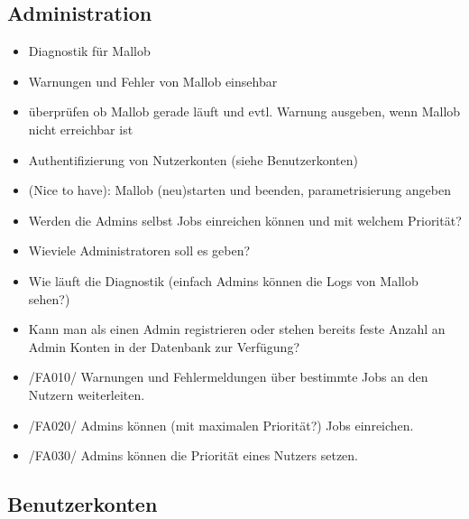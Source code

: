 \subsection{Administration}
\begin{itemize}
    \item Diagnostik für Mallob
    \item Warnungen und Fehler von Mallob einsehbar
    \item überprüfen ob Mallob gerade läuft und evtl. Warnung ausgeben, wenn Mallob nicht erreichbar ist
    \item Authentifizierung von Nutzerkonten (siehe Benutzerkonten)
    
        
    \item (Nice to have): Mallob (neu)starten und beenden, parametrisierung angeben
    
    \item Werden die Admins selbst Jobs einreichen können und mit welchem Priorität?
    \item Wieviele Administratoren soll es geben?
    \item Wie läuft die Diagnostik (einfach Admins können die Logs von Mallob sehen?)
    \item Kann man als einen Admin registrieren oder stehen bereits feste Anzahl an Admin Konten in der Datenbank zur Verfügung?
    \item /FA010/ Warnungen und Fehlermeldungen über bestimmte Jobs an den Nutzern weiterleiten.
    \item /FA020/ Admins können (mit maximalen Priorität?) Jobs einreichen.
    \item /FA030/ Admins können die Priorität eines Nutzers setzen.
\end{itemize}


\subsection{Benutzerkonten}

